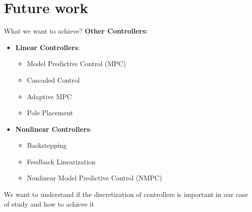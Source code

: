 \section{Future work}

\begin{frame}{What we want to achieve?}
\textbf{Other Controllers:}
\begin{itemize}
    \item \textbf{Linear Controllers}:
    \begin{itemize}
        \item Model Predictive Control (MPC)
        \item Cascaded Control
        \item Adaptive MPC
        \item Pole Placement
    \end{itemize}

    \item \textbf{Nonlinear Controllers}:
    \begin{itemize}
        \item Backstepping
        \item Feedback Linearization
        \item Nonlinear Model Predictive Control (NMPC)
    \end{itemize}
\end{itemize}

We want to understand if the discretization of controllers is important in our case of study and how to achieve it


\end{frame}